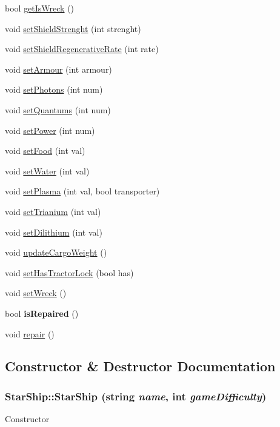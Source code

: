 \begin{DoxyCompactItemize}
\item 
bool \hyperlink{classStarShip_ac0a6b7de51c9b461ca186d1412f4208f}{getIsWreck} ()
\item 
void \hyperlink{classStarShip_abe926e5606f91d6ec80b6779fee16e39}{setShieldStrenght} (int strenght)
\item 
void \hyperlink{classStarShip_a9b41a780259b41ebec4b69de12ecc276}{setShieldRegenerativeRate} (int rate)
\item 
void \hyperlink{classStarShip_a599c3c86e50738951fc468544fa916e4}{setArmour} (int armour)
\item 
void \hyperlink{classStarShip_a207cd846544ef333a25b14d737fa934a}{setPhotons} (int num)
\item 
void \hyperlink{classStarShip_a54668a25efe99edc19892e3433008843}{setQuantums} (int num)
\item 
void \hyperlink{classStarShip_a3e690a6c422f5d863086536313d68bb9}{setPower} (int num)
\item 
void \hyperlink{classStarShip_a5c1681ff3b6d20aa7cbb6bce36ab74fe}{setFood} (int val)
\item 
void \hyperlink{classStarShip_a61a1341a3e3640eea186cedae52fbd0e}{setWater} (int val)
\item 
void \hyperlink{classStarShip_afb3ed2798519853ab293432604e4fb0c}{setPlasma} (int val, bool transporter)
\item 
void \hyperlink{classStarShip_a77b32c7f2290cafd2827b868c962d6e9}{setTrianium} (int val)
\item 
void \hyperlink{classStarShip_a99530aa5ae4093bc75d5df1efa5dbdde}{setDilithium} (int val)
\item 
void \hyperlink{classStarShip_ad1a29b9f7ee09f56a78b9994830241b6}{updateCargoWeight} ()
\item 
void \hyperlink{classStarShip_a44bc85e4cbd29a883d1068a08ab6b4b4}{setHasTractorLock} (bool has)
\item 
void \hyperlink{classStarShip_ae9dbbdaa20a964e2befe24475173651b}{setWreck} ()
\item 
\hypertarget{classStarShip_a4390093c0fee4786a46273f841376d3b}{
bool {\bfseries isRepaired} ()}
\label{da/d97/classStarShip_a4390093c0fee4786a46273f841376d3b}

\item 
void \hyperlink{classStarShip_a7206221c5678eca12784b38ee333292e}{repair} ()
\end{DoxyCompactItemize}


\subsection{Constructor \& Destructor Documentation}
\hypertarget{classStarShip_a616271a6df7759753f1919e1e244744e}{
\subsubsection[{StarShip}]{\setlength{\rightskip}{0pt plus 5cm}StarShip::StarShip (string {\em name}, \/  int {\em gameDifficulty})}}
\label{da/d97/classStarShip_a616271a6df7759753f1919e1e244744e}
Constructor


